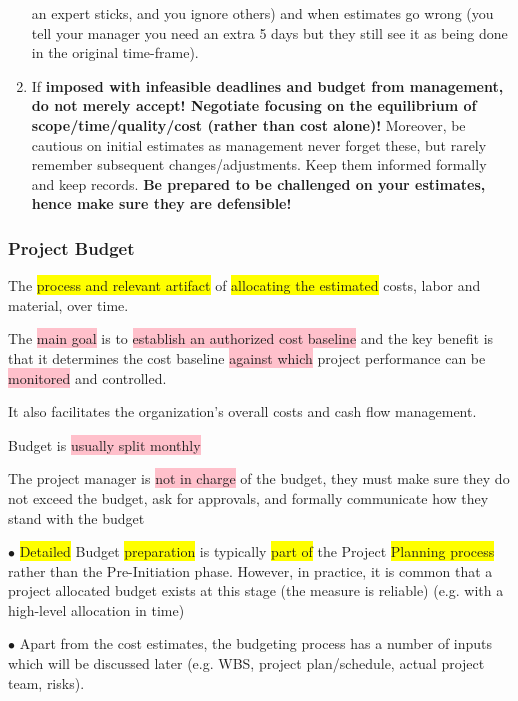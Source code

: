 \documentclass[]{project_plan}
\newcommand{\bulletPoint}{\hspace{-3.1pt}$\bullet$ \hspace{5pt}}
\begin{document}
\begin{enumerate}
        an expert sticks, and you ignore others) and when estimates go wrong (you tell your manager you need an extra 5 days but
        they still see it as being done in the original time-frame).
  \item If \textbf{imposed with infeasible deadlines and budget from management, do not merely accept! Negotiate focusing on the
          equilibrium of scope/time/quality/cost (rather than cost alone)!} Moreover, be cautious on initial estimates as management
        never forget these, but rarely remember subsequent changes/adjustments. Keep them informed formally and keep records.
        \textbf{Be prepared to be challenged on your estimates, hence make sure they are defensible!}
\end{enumerate}

\subsubsection{Project Budget}

The \colorbox{yellow}{process and relevant artifact} of \colorbox{yellow}{allocating the estimated} costs, labor and
material, over time.

The \colorbox{pink}{main goal} is to \colorbox{pink}{establish an authorized cost baseline} and the key benefit
is that it determines the cost baseline \colorbox{pink}{against which} project performance can be \colorbox{pink}{monitored} and
controlled.

It also facilitates the organization’s overall costs and cash flow management.

Budget is \colorbox{pink}{usually split monthly}

The project manager is \colorbox{pink}{not in charge} of the budget, they must make sure they
do not exceed the budget, ask for approvals, and formally communicate how they
stand with the budget

\bulletPoint \colorbox{yellow}{Detailed} Budget \colorbox{yellow}{preparation} is typically \colorbox{yellow}{part of} the Project \colorbox{yellow}{Planning process} rather than the
Pre-Initiation phase. However, in practice, it is common that a project allocated budget exists at
this stage (the measure is reliable)  (e.g. with a high-level allocation in time)

\bulletPoint Apart from the cost estimates, the budgeting process has a number of inputs which will be
discussed later (e.g. WBS, project plan/schedule, actual project team, risks).
\end{document}
